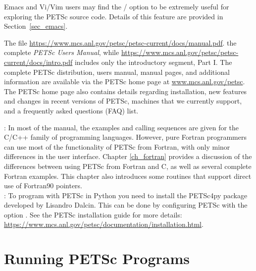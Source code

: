 Emacs and Vi/Vim users may find the
/  option to be extremely useful for exploring the PETSc
source code.  Details of this feature are provided in
Section~\ref{sec_emacs}.

The file \href{https://www.mcs.anl.gov/petsc/petsc-current/docs/manual.pdf}{https://www.mcs.anl.gov/petsc/petsc-current/docs/manual.pdf}.
the complete {\em PETSc Users Manual},
while \href{https://www.mcs.anl.gov/petsc/petsc-current/docs/intro.pdf}{https://www.mcs.anl.gov/petsc/petsc-current/docs/intro.pdf}
includes only the introductory segment, Part I.  
The complete PETSc distribution, users
manual, manual pages, and additional information are available via
the PETSc home page at
\href{https://www.mcs.anl.gov/petsc}{www.mcs.anl.gov/petsc}.
The PETSc home page also
contains details regarding installation, new features and changes in recent
versions of PETSc, machines that we currently support, and a frequently asked questions (FAQ) list.

\medskip\medskip

: In most of the
manual, the examples and calling sequences are given for the C/C++
family of programming languages.  
However, pure Fortran programmers can use most of the
functionality of PETSc from Fortran, with only minor differences in
the user interface.  Chapter \ref{ch_fortran} provides a discussion of the
differences between using PETSc from Fortran and C, as well as several
complete Fortran examples.  This chapter also introduces some
routines that support direct use of Fortran90 pointers. \\

: \label{petsc4py} 
To program with PETSc in Python you need to install the PETSc4py package developed by
Lisandro Dalcin. This can be done by configuring PETSc with the option . See the PETSc installation guide
for more details:\\ \href{https://www.mcs.anl.gov/petsc/documentation/installation.html}{https://www.mcs.anl.gov/petsc/documentation/installation.html}.

\section{Running PETSc Programs}
\label{sec_running}


